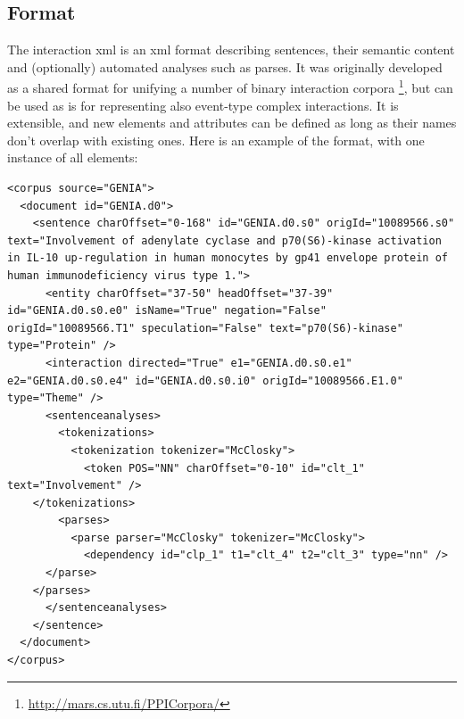 \documentclass[a4paper,12pt]{article}
\begin{document}
\subsection{Format}

The interaction xml is an xml format describing sentences, their semantic content
and (optionally) automated analyses such as parses. It was originally
developed as a shared format for unifying a number of binary interaction corpora
\footnote{\url{http://mars.cs.utu.fi/PPICorpora/}}, but can be used as is for
representing also event-type complex interactions. It is extensible, and new
elements and attributes can be defined as long as their names don't overlap with existing
ones. Here is an example of the format, with one instance of all elements:


\begin{lstlisting}
<corpus source="GENIA">
  <document id="GENIA.d0">
    <sentence charOffset="0-168" id="GENIA.d0.s0" origId="10089566.s0" text="Involvement of adenylate cyclase and p70(S6)-kinase activation in IL-10 up-regulation in human monocytes by gp41 envelope protein of human immunodeficiency virus type 1.">
      <entity charOffset="37-50" headOffset="37-39" id="GENIA.d0.s0.e0" isName="True" negation="False" origId="10089566.T1" speculation="False" text="p70(S6)-kinase" type="Protein" />
      <interaction directed="True" e1="GENIA.d0.s0.e1" e2="GENIA.d0.s0.e4" id="GENIA.d0.s0.i0" origId="10089566.E1.0" type="Theme" />
      <sentenceanalyses>
        <tokenizations>
          <tokenization tokenizer="McClosky">
            <token POS="NN" charOffset="0-10" id="clt_1" text="Involvement" />
 	</tokenizations>
        <parses>
          <parse parser="McClosky" tokenizer="McClosky">
            <dependency id="clp_1" t1="clt_4" t2="clt_3" type="nn" />
	  </parse>
	</parses>
      </sentenceanalyses>
    </sentence>
  </document>
</corpus>
\end{lstlisting}
\end{document}
